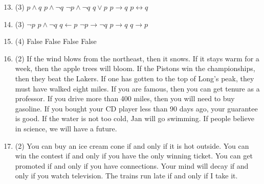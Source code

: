 \documentclass[12pt]{article}
\newcommand{\enumset}[1]{\setcounter{enumi}{#1}}
\begin{document}
\begin{enumerate}
				\enumset{12}
				\item
					\begin{tasks}(3)
						\task
							\(p \land q\)
						\task
							\(p \land \lnot q\)
						\task
							\(\lnot p \land \lnot q\)
						\task
							\(q \lor p\)
						\task
							\(p \to q\)
						\task
							\(p \leftrightarrow q\)
					\end{tasks}
				\enumset{14}
				\item
					\begin{tasks}(3)
						\task
							\(\lnot p\)
						\task
							\(p \land \lnot q\)
						\task
							\(q \leftarrow p\)
						\task
							\(\lnot p \to \lnot q\)
						\task
							\(p \to q\)
						\task
							\(q \to p\)
					\end{tasks}
				\enumset{18}
				\item
					\begin{tasks}(4)
						\task
							False
						\task
							False
						\task
							False
						\task
							False	
					\end{tasks}
				\enumset{24}
				\item
					\begin{tasks}(2)
						\task
							If the wind blows from the northeast, then it snows.
						\task
							If it stays warm for a week, then the apple trees will bloom.
						\task
							If the Pistons win the championships, then they beat the Lakers.
						\task
							If one has gotten to the top of Long's peak, they must have walked eight miles.
						\task
							If you are famous, then you can get tenure as a professor.
						\task
							If you drive more than 400 miles, then you will need to buy gasoline.
						\task
							If you bought your CD player less than 90 days ago, your guarantee is good.
						\task
							If the water is not too cold, Jan will go swimming.
						\task
							If people believe in science, we will have a future.
					\end{tasks}
				\enumset{26}
				\item
					\begin{tasks}(2)
						\task
							You can buy an ice cream cone if and only if it is hot outside.
						\task
							You can win the contest if and only if you have the only winning ticket.
						\task
							You can get promoted if and only if you have connections.
						\task
							Your mind will decay if and only if you watch television.
						\task
							The trains run late if and only if I take it.
					\end{tasks}

\end{enumerate}
\end{document}

